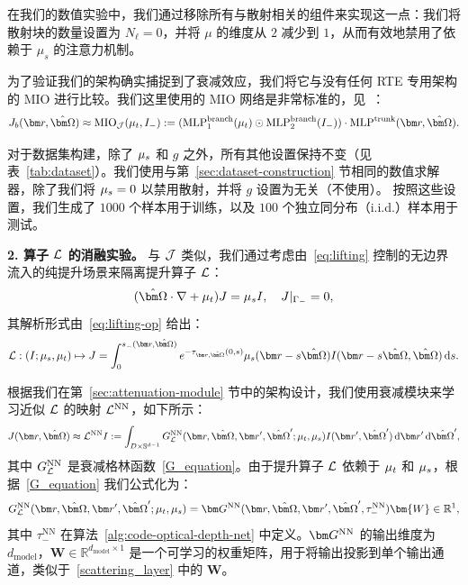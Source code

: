 在我们的数值实验中，我们通过移除所有与散射相关的组件来实现这一点：我们将散射块的数量设置为 $N_\ell = 0$，并将 $\mu$ 的维度从 $2$ 减少到 $1$，从而有效地禁用了依赖于 $\mu_s$ 的注意力机制。

为了验证我们的架构确实捕捉到了衰减效应，我们将它与没有任何 RTE 专用架构的 MIO 进行比较。我们这里使用的 MIO 网络是非常标准的，见~\cite{jin2022mionet}：
\begin{equation}
    J_b(\br,\bOmega) \approx \text{MIO}_{\J}(\mut,I_{-}) := (\text{MLP}^{\text{branch}}_1(\mut)\odot\text{MLP}^{\text{branch}}_2(I_-))\cdot \text{MLP}^{\text{trunk}}(\br,\bOmega).
\end{equation}

对于数据集构建，除了 $\mu_s$ 和 $g$ 之外，所有其他设置保持不变（见表~\ref{tab:dataset}）。我们使用与第~\ref{sec:dataset-construction} 节相同的数值求解器，除了我们将 $\mu_s = 0$ 以禁用散射，并将 $g$ 设置为无关（不使用）。
按照这些设置，我们生成了 $1000$ 个样本用于训练，以及 $100$ 个独立同分布（i.i.d.）样本用于测试。

\textbf{2. 算子 $\mathcal{L}$ 的消融实验。} 与 $\mathcal{J}$ 类似，我们通过考虑由~\eqref{eq:lifting} 控制的无边界流入的纯提升场景来隔离提升算子 $\mathcal{L}$：
\begin{equation}
    (\bOmega\cdot\nabla + \mut)J = \mus I, \quad  J|_{\Gamma_{-}} = 0,
\end{equation}
其解析形式由~\eqref{eq:lifting-op} 给出：
\begin{equation}
    \cL:(I;\mus,\mut) \mapsto J = \int_0^{s_{-}(\br, \bOmega)} e^{-\tau_{\br,\bOmega}(0,s)}\mus(\br-s\bOmega)I(\br-s\bOmega, \bOmega)\diff{s}.
\end{equation}

根据我们在第~\ref{sec:attenuation-module} 节中的架构设计，我们使用衰减模块来学习近似 $\mathcal{L}$ 的映射 $\mathcal{L}^{\text{NN}}$，如下所示：
\begin{equation}
    J(\br,\bOmega) \approx \cL^{\text{NN}}I := \int_{D\times\sS^{d-1}}
    G_{\cL}^{\text{NN}}(\br,\bOmega,\br',\bOmega';\mut,\mus)I(\br',\bOmega')\diff{\br'}\diff{\bOmega'},
\end{equation}
其中 $G^{\text{NN}}_{\mathcal{L}}$ 是衰减格林函数~\eqref{G_equation}。由于提升算子 $\mathcal{L}$ 依赖于 $\mu_t$ 和 $\mu_s$，根据~\eqref{G_equation} 我们公式化为：
\begin{equation}
    G_{\cL}^{\text{NN}}(\br,\bOmega, \br', \bOmega';\mut,\mus) = \bG^{\text{NN}}(\br,\bOmega, \br', \bOmega', \tau^{\text{NN}}_{-})\bm{W}\in\mathbb{R}^1,
\end{equation}
其中 $\tau^{\text{NN}}_{-}$ 在算法~\ref{alg:code-optical-depth-net} 中定义。$\bG^{\text{NN}}$ 的输出维度为 $d_\text{model}$，$\bm{W} \in \mathbb{R}^{d_{\text{model}}\times 1}$ 是一个可学习的权重矩阵，用于将输出投影到单个输出通道，类似于~\eqref{scattering_layer} 中的 $\bm{W}$。

